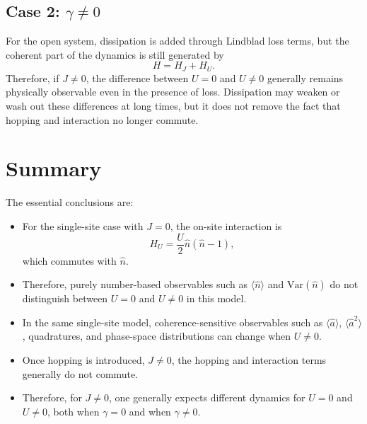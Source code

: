 \documentclass[12pt]{article}
\begin{document}
\subsection*{Case 2: $\gamma \neq 0$}
For the open system, dissipation is added through Lindblad loss terms, but the coherent part of the dynamics is still generated by
\[
H = H_J + H_U.
\]
Therefore, if $J \neq 0$, the difference between $U=0$ and $U \neq 0$ generally remains physically observable even in the presence of loss. Dissipation may weaken or wash out these differences at long times, but it does not remove the fact that hopping and interaction no longer commute.

\section*{Summary}
The essential conclusions are:
\begin{itemize}
\item For the single-site case with $J=0$, the on-site interaction is
\[
H_U = \frac{U}{2}\hat n(\hat n-1),
\]
which commutes with $\hat n$.
\item Therefore, purely number-based observables such as $\langle \hat n \rangle$ and $\mathrm{Var}(\hat n)$ do not distinguish between $U=0$ and $U \neq 0$ in this model.
\item In the same single-site model, coherence-sensitive observables such as $\langle \hat a \rangle$, $\langle \hat a^2 \rangle$, quadratures, and phase-space distributions can change when $U \neq 0$.
\item Once hopping is introduced, $J \neq 0$, the hopping and interaction terms generally do not commute.
\item Therefore, for $J \neq 0$, one generally expects different dynamics for $U=0$ and $U \neq 0$, both when $\gamma=0$ and when $\gamma \neq 0$.
\end{itemize}
\end{document}
